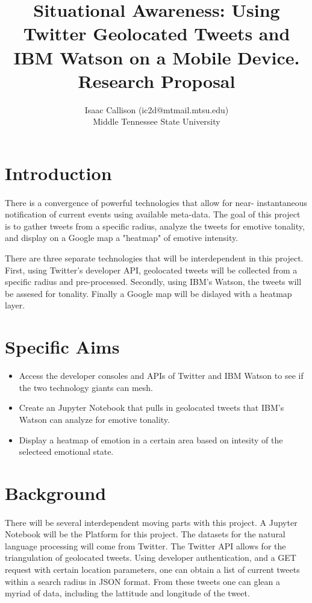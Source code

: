 \documentclass[12pt, oneside]{article}
\title{Situational Awareness: Using Twitter Geolocated Tweets and IBM Watson on a Mobile Device.
\\\medskip Research Proposal}
\author{Isaac Callison (ic2d@mtmail.mtsu.edu)\\Middle Tennessee State University}
\begin{document}
\maketitle
\nocite{*}
\newpage{}

\section{Introduction}
\paragraph{}
There is a convergence of powerful technologies that allow for near-
instantaneous notification of current events using available meta-data.
The goal of this project is to gather tweets from a specific radius, analyze the tweets for emotive tonality, and display on a Google map a "heatmap" of emotive intensity.

There are three separate technologies that will be interdependent in this
project. First, using Twitter's developer API, geolocated tweets will be
collected from a specific radius and pre-processed. Secondly, using IBM's Watson, the tweets will be assesed for tonality. Finally a Google map will be dislayed with a heatmap layer.


\section{Specific Aims}
\begin{itemize}
 \item Access the developer consoles and APIs of Twitter and IBM Watson to see
 if the two technology giants can mesh.

 \item Create an Jupyter Notebook that pulls in geolocated tweets that IBM's Watson can analyze for emotive tonality.

 \item Display a heatmap of emotion in a certain area based on intesity of the selecteed emotional state.

\end{itemize}

\section{Background}
\paragraph{}
There will be several interdependent moving parts with this project.
A Jupyter Notebook will be the Platform for this project.
The datasets for the natural language processing will come from Twitter. The
Twitter API allows for the triangulation of geolocated tweets\cite{TwitterGeo}.
Using developer authentication, and a GET request with certain location parameters, one can obtain a list of current tweets within a search radius in JSON format. From these tweets one can glean a myriad of data, including the lattitude and longitude of the tweet.
\end{document}
